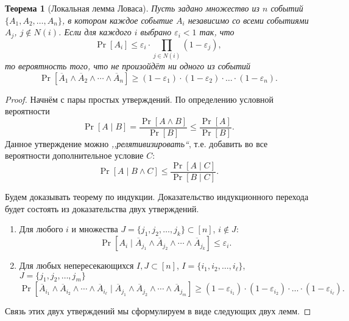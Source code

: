 \documentclass[12pt]{article}
\newcommand{\seqn}[2]{{#1}_1,{#1}_2,\dotsc,{#1}_{#2}}
\theoremstyle{definition}
\theoremstyle{plain}
\newtheorem{theorem}{Теорема}[section]
\theoremstyle{remark}
\begin{document}
\begin{theorem}[Локальная лемма Ловаса] Пусть задано множество из $n$ событий $\{\seqn{A}{n}\}$,
    в котором каждое событие $A_i$ независимо со всеми событиями $A_j$, $j\not\in N(i)$.
    Если для каждого $i$ выбрано $\varepsilon_i < 1$ так, что
    \[
    \Pr[A_i]\le \varepsilon_i\cdot\prod_{j\in N(i)} (1 - \varepsilon_j),
    \]
    то вероятность того, что не произойдёт ни одного из событий
    \[
    \Pr[\overline{A}_1\land\overline{A}_2\land\dotsb\land\overline{A}_n] 
        \ge (1 - \varepsilon_1)\cdot(1 - \varepsilon_2) \cdot\dotso\cdot (1 - \varepsilon_n). 
    \]
\end{theorem}
\begin{proof}
    Начнём с пары простых утверждений. По определению условной вероятности
    \[
    \Pr[A\mid B] = \frac{\Pr[A\land B]}{\Pr[B]} \le \frac{\Pr[A]}{\Pr[B]}.
    \]
    Данное утверждение можно \emph{,,релятивизировать``}, т.е. добавить во все вероятности
    дополнительное условие $C$:
    \begin{equation}\label{eq:lll:fact}
    \Pr[A\mid B\land C] \le \frac{\Pr[A\mid C]}{\Pr[B \mid C]}.
    \end{equation}
    
    Будем доказывать теорему по индукции. Доказательство индукционного перехода будет 
    состоять из доказательства двух утверждений.
    \begin{enumerate}
        \item Для любого $i$ и множества $J=\{\seqn{j}{k}\} \subset [n]$, $i\not\in J$:
            \begin{equation}\label{eq:lll:ind1}
                \Pr[A_i\mid \overline A_{j_1}\land \overline A_{j_2}
                    \land\dotsb\land \overline A_{j_k}] \le \varepsilon_i.
             \end{equation}
        \item Для любых непересекающихся $I,J\subset [n]$, $I=\{\seqn{i}{\ell}\}$, $J=\{\seqn{j}{m}\}$ 
            \begin{equation}\label{eq:lll:ind2}
                \Pr[\overline A_{i_1}\land \overline A_{i_2} \land\dotsb\land \overline A_{i_\ell} \mid 
                    \overline A_{j_1}\land \overline A_{j_2} \land\dotsb\land \overline A_{j_m} ] \ge
                    (1 - \varepsilon_{i_1})\cdot(1 - \varepsilon_{i_2})\cdot\dotso\cdot(1 - \varepsilon_{i_\ell}).
            \end{equation}
    \end{enumerate}
    Связь этих двух утверждений мы сформулируем в виде следующих двух лемм.
    

\end{proof}
\end{document}
